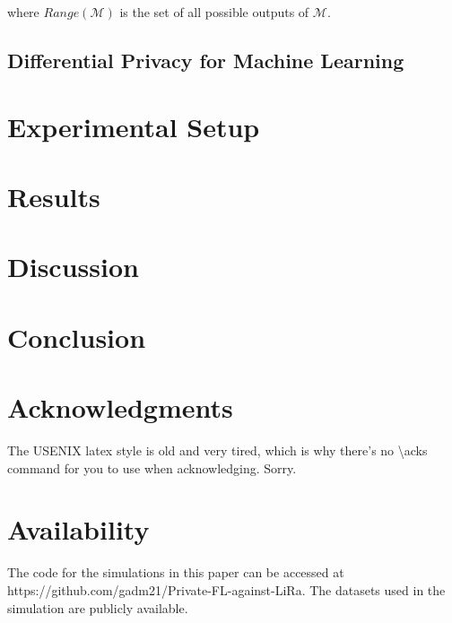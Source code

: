     where $Range(\mathcal{M})$ is the set of all possible outputs of $\mathcal{M}$.





\subsection{Differential Privacy for Machine Learning}
\label{sec:dpml}


\section{Experimental Setup}
\label{sec:exp}


\section{Results}
\label{sec:results}

\section{Discussion}
\label{sec:discussion}

\section{Conclusion}
\label{sec:conclusion}

\section*{Acknowledgments}


The USENIX latex style is old and very tired, which is why
there's no \textbackslash{}acks command for you to use when
acknowledging. Sorry.

\section*{Availability}

The code for the simulations in this paper can be accessed at https://github.com/gadm21/Private-FL-against-LiRa. The datasets used in the simulation are publicly available. 









